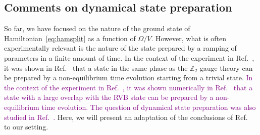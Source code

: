 \documentclass[twocolumn,superscriptaddress,amsmath,amssymb,aps,prx,nofootinbib]{revtex4-2}
\newcommand{\newtext}[1]{\textcolor{purple}{#1}}
\begin{document}
\subsection{Comments on dynamical state preparation}\label{sec:dynamics}
So far, we have focused on the nature of the ground state of Hamiltonian~\eqref{eq:hamsplit} as a function of $\Omega/V$. However, what is often experimentally relevant is the nature of the state prepared by a ramping of parameters in a finite amount of time. In the context of the experiment in Ref.~\cite{semeghini2021}, it was shown in Ref.~\cite{giudici2022dynamical,sahay2022quantum} that a state in the same phase as the $\mathbb{Z}_2$ gauge theory can be prepared by a non-equilibrium time evolution starting from a trivial state.
\newtext{In the context of the experiment in Ref.~\cite{semeghini2021}, it was shown numerically in Ref.~\cite{giudici2022dynamical} that a state with a large overlap with the RVB state can be prepared by a non-equilibrium time evolution.
The question of dynamical state preparation was also studied in Ref.~\cite{sahay2022quantum}.}
Here, we will present an adaptation of the conclusions of Ref.~\cite{sahay2022quantum} to our setting. 
\end{document}
